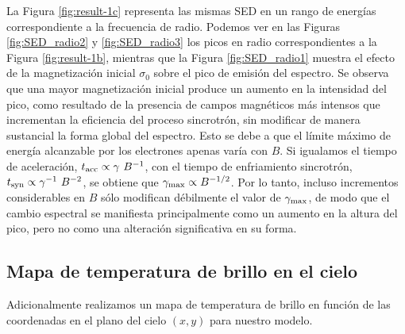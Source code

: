	La Figura \ref{fig:result-1c} representa las mismas SED en un rango de energ\'ias correspondiente a la frecuencia de radio. Podemos ver en las Figuras \ref{fig:SED_radio2} y \ref{fig:SED_radio3} los picos en radio correspondientes a la Figura \ref{fig:result-1b}, mientras que la Figura \ref{fig:SED_radio1} muestra el efecto de la magnetización inicial $\sigma_0$ sobre el pico de emisión del espectro.
	Se observa que una mayor magnetización inicial produce un aumento en la intensidad del pico, como resultado de la presencia de campos magnéticos más intensos que incrementan la eficiencia del proceso sincrotrón, sin modificar de manera sustancial la forma global del espectro.
	Esto se debe a que el límite máximo de energía alcanzable por los electrones apenas varía con $B$.
	Si igualamos el tiempo de aceleración, $t_{\rm acc}\propto \gamma~ B^{-1}$, con el tiempo de enfriamiento sincrotrón, $t_{\rm syn}\propto \gamma^{-1}~B^{-2}$, se obtiene que $\gamma_{\rm max}\propto B^{-1/2}$.
	Por lo tanto, incluso incrementos considerables en $B$ sólo modifican débilmente el valor de $\gamma_{\rm max}$, de modo que el cambio espectral se manifiesta principalmente como un aumento en la altura del pico, pero no como una alteración significativa en su forma.



\subsection{Mapa de temperatura de brillo en el cielo}

	Adicionalmente realizamos un mapa de temperatura de brillo en función de las coordenadas en el plano del cielo $(x,y)$ para nuestro modelo.

